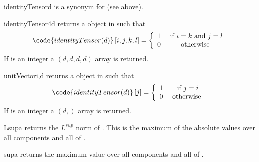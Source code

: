 \begin{funcdesc}{identityTensor}{d}
is a synonym for  (see above).
\end{funcdesc}
\begin{funcdesc}{identityTensor4}{d}
returns a \RankFour \Data object in \FunctionSpace {} such that
\begin{equation}
\code{identityTensor(d)}\left[ i,j,k,l\right] = \left\{
\begin{array}{cc}
1 & \mbox{ if } i=k \mbox{ and } j=l\\
0 & \mbox{ otherwise }
\end{array}
\right.
\end{equation}
If  is an integer a $(d,d,d,d)$ \numpy array is returned.
\end{funcdesc}
\begin{funcdesc}{unitVector}{i,d}
returns a \RankOne \Data object in \FunctionSpace {} such that
\begin{equation}
\code{identityTensor(d)}\left[ j \right] = \left\{
\begin{array}{cc}
1 & \mbox{ if } j=i\\
0 & \mbox{ otherwise }
\end{array}
\right.
\end{equation}
If  is an integer a $(d,)$ \numpy array is returned.

\end{funcdesc}

\begin{funcdesc}{Lsup}{a}
returns the $L^{sup}$ norm of . This is the maximum of the absolute values
 over all components and all \DataSamplePoints of .
\end{funcdesc}

\begin{funcdesc}{sup}{a}
returns the maximum value over all components and all \DataSamplePoints of .
\end{funcdesc}

